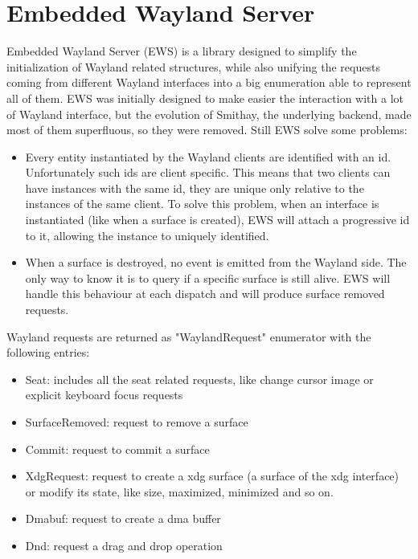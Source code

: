 \chapter{Embedded Wayland Server}
Embedded Wayland Server (EWS) is a library designed to simplify the initialization of Wayland related structures, while also unifying the requests coming from different Wayland interfaces into a big enumeration able to represent all of them. EWS was initially designed to make easier the interaction with a lot of Wayland interface, but the evolution of Smithay, the underlying backend, made most of them superfluous, so they were removed. Still EWS solve some problems:
\begin{itemize}
	\item Every entity instantiated by the Wayland clients are identified with an id. Unfortunately such ids are client specific. This means that two clients can have instances with the same id, they are unique only relative to the instances of the same client. To solve this problem, when an interface is instantiated (like when a surface is created), EWS will attach a progressive id to it, allowing the instance to uniquely identified.
	\item When a surface is destroyed, no event is emitted from the Wayland side. The only way to know it is to query if a specific surface is still alive. EWS will handle this behaviour at each dispatch and will produce surface removed requests.
\end{itemize}

Wayland requests are returned as "WaylandRequest" enumerator with the following entries:
\begin{itemize}
	\item Seat: includes all the seat related requests, like change cursor image or explicit keyboard focus requests
	\item SurfaceRemoved: request to remove a surface
	\item Commit: request to commit a surface
	\item XdgRequest: request to create a xdg surface (a surface of the xdg interface) or modify its state, like size, maximized, minimized and so on.
	\item Dmabuf: request to create a dma buffer
	\item Dnd: request a drag and drop operation
\end{itemize}